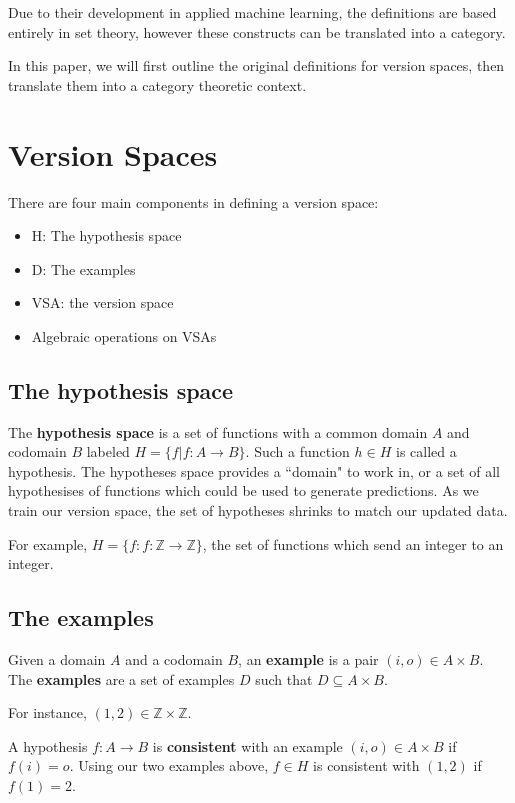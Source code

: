 \documentclass{article}
\theoremstyle{definition}
\begin{document}
Due to their development in applied machine learning, the definitions are based entirely in set theory, however these constructs can be translated into a category. 

In this paper, we will first outline the original definitions for version spaces, then translate them into a category theoretic context. 

\section{Version Spaces}
There are four main components in defining a version space: 
\begin{itemize}
    \item H: The hypothesis space
    \item D: The examples
    \item VSA: the version space
    \item Algebraic operations on VSAs
\end{itemize}


\subsection{The hypothesis space}

The \textbf{hypothesis space} is a set of functions with a common domain $A$ and codomain $B$ labeled $H = \{f | f: A \rightarrow B \}$. Such a function $h \in H$ is called a hypothesis.  The hypotheses space provides a ``domain" to work in, or a set of all hypothesises of functions which could be used to generate predictions. As we train our version space, the set of hypotheses shrinks to match our updated data. 

For example, $H = \{f: f: \mathbb{Z} \rightarrow \mathbb{Z}\}$, the set of functions which send an integer to an integer. 

\subsection{The examples}
Given a domain $A$ and a codomain $B$, an \textbf{example} is a pair $(i, o)\in A \times B$. The \textbf{examples} are a set of examples $D$ such that $D \subseteq A \times B$. 

For instance, $(1,2) \in \mathbb{Z} \times \mathbb{Z}$. 

A hypothesis $f: A\rightarrow B$ is \textbf{consistent} with an example $(i,o) \in A\times B$ if $f(i) = o$. Using our two examples above, $f\in H $ is consistent with $(1,2)$ if $f(1) = 2$. 
\end{document}
